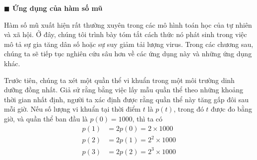 \begin{minipage}[t]{0.708\textwidth}
    \vspace{1.0em}
    \noindent\textbf{\textsf{\large\color{stewartcyan}$\blacksquare$\; \color{black}Ứng dụng của hàm số mũ}}

    \vspace{0.5em}
    \noindent Hàm số mũ xuất hiện rất thường xuyên trong các mô hình toán học của tự nhiên và xã hội. Ở đây, chúng tôi trình bày tóm tắt cách thức nó phát sinh trong việc mô tả sự gia tăng dân số hoặc sự suy giảm tải lượng virus. Trong các chương sau, chúng ta sẽ tiếp tục nghiên cứu sâu hơn về các ứng dụng này và những ứng dụng khác.

    \vspace{0.5em}
    Trước tiên, chúng ta xét một quần thể vi khuẩn trong một môi trường dinh dưỡng đồng nhất. Giả sử rằng bằng việc lấy mẫu quần thể theo những khoảng thời gian nhất định, người ta xác định được rằng quần thể này tăng gấp đôi sau mỗi giờ. Nếu số lượng vi khuẩn tại thời điểm $t$ là $p(t)$, trong đó $t$ được đo bằng giờ, và quần thể ban đầu là $p(0) = 1000$, thì ta có
    \begin{align*}
        p(1) &= 2p(0) = 2 \times 1000 \\
        p(2) &= 2p(1) = 2^2 \times 1000 \\
        p(3) &= 2p(2) = 2^3 \times 1000
    \end{align*}
\end{minipage}